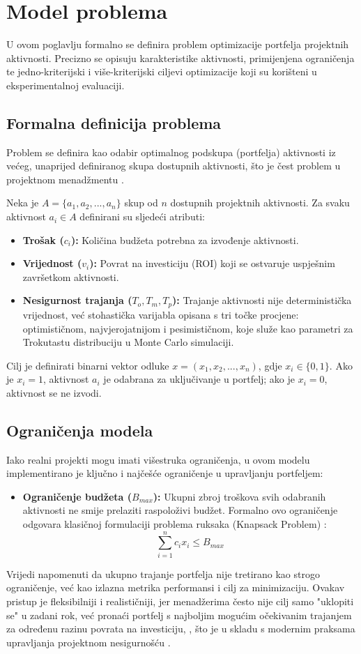 \section{Model problema}
U ovom poglavlju formalno se definira problem optimizacije portfelja projektnih aktivnosti. Precizno se opisuju karakteristike aktivnosti, primijenjena ograničenja te jedno-kriterijski i više-kriterijski ciljevi optimizacije koji su korišteni u eksperimentalnoj evaluaciji.

\subsection{Formalna definicija problema}
Problem se definira kao odabir optimalnog podskupa (portfelja) aktivnosti iz većeg, unaprijed definiranog skupa dostupnih aktivnosti, što je čest problem u projektnom menadžmentu \cite{PMI2021, Kerzner2017}.

Neka je $A=\{a_1, a_2, ..., a_n\}$ skup od $n$ dostupnih projektnih aktivnosti. Za svaku aktivnost $a_i \in A$ definirani su sljedeći atributi:
\begin{itemize}
    \item \textbf{Trošak ($c_i$):} Količina budžeta potrebna za izvođenje aktivnosti.
    \item \textbf{Vrijednost ($v_i$):} Povrat na investiciju (ROI) koji se ostvaruje uspješnim završetkom aktivnosti.
    \item \textbf{Nesigurnost trajanja ($T_o, T_m, T_p$):} Trajanje aktivnosti nije deterministička vrijednost, već stohastička varijabla opisana s tri točke procjene: optimističnom, najvjerojatnijom i pesimističnom, koje služe kao parametri za Trokutastu distribuciju u Monte Carlo simulaciji.
\end{itemize}
Cilj je definirati binarni vektor odluke $x=(x_1, x_2, ..., x_n)$, gdje $x_i \in \{0,1\}$. Ako je $x_i=1$, aktivnost $a_i$ je odabrana za uključivanje u portfelj; ako je $x_i=0$, aktivnost se ne izvodi.

\subsection{Ograničenja modela}
Iako realni projekti mogu imati višestruka ograničenja, u ovom modelu implementirano je ključno i najčešće ograničenje u upravljanju portfeljem:
\begin{itemize}
    \item \textbf{Ograničenje budžeta ($B_{max}$):} Ukupni zbroj troškova svih odabranih aktivnosti ne smije prelaziti raspoloživi budžet. Formalno ovo ograničenje odgovara klasičnoj formulaciji problema ruksaka (Knapsack Problem) \cite{Kellerer2004}:
    $$ \sum_{i=1}^n c_i x_i \leq B_{max} $$
\end{itemize}
Vrijedi napomenuti da ukupno trajanje portfelja nije tretirano kao strogo ograničenje, već kao izlazna metrika performansi i cilj za minimizaciju. Ovakav pristup je fleksibilniji i realističniji, jer menadžerima često nije cilj samo "uklopiti se" u zadani rok, već pronaći portfelj s najboljim mogućim očekivanim trajanjem za određenu razinu povrata na investiciju, , što je u skladu s modernim praksama upravljanja projektnom nesigurnošću \cite{Smith2014}.

